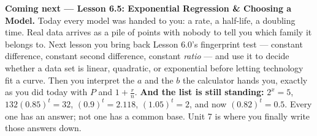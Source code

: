 \documentclass[10pt]{article}
\begin{document}
\begin{spiralbox}
\textbf{Coming next --- Lesson 6.5: Exponential Regression \& Choosing a Model.} Today every model was
handed to you: a rate, a half-life, a doubling time. Real data arrives as a pile of points with nobody
to tell you which family it belongs to. Next lesson you bring back Lesson 6.0's fingerprint test ---
constant difference, constant second difference, constant \emph{ratio} --- and use it to decide whether
a data set is linear, quadratic, or exponential before letting technology fit a curve. Then you
interpret the $a$ and the $b$ the calculator hands you, exactly as you did today with $P$ and
$1+\frac{r}{n}$. \textbf{And the list is still standing:} $2^{x}=5$, $132(0.85)^{t}=32$,
$(0.9)^{t}=2.118$, $(1.05)^{t}=2$, and now $(0.82)^{t}=0.5$. Every one has an answer; not one has a
common base. Unit 7 is where you finally write those answers down.
\end{spiralbox}
\end{document}
